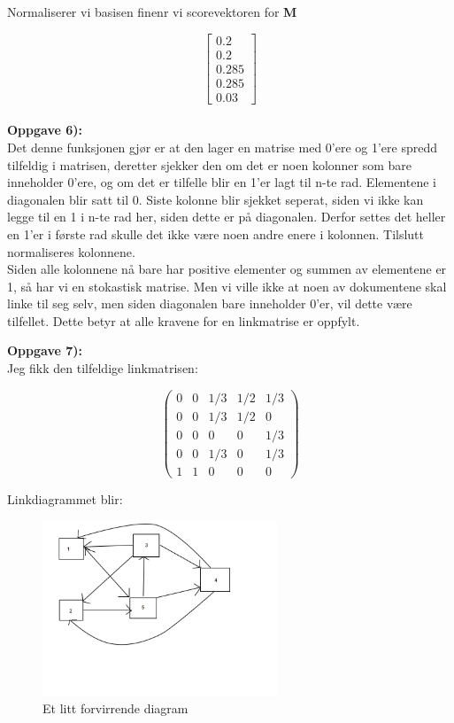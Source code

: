 \documentclass[a4paper,norsk,11pt,twoside]{article}
\begin{document}
Normaliserer vi basisen finenr vi scorevektoren for \textbf{M}

$$
\begin{bmatrix}
0.2 \\ 0.2 \\ 0.285 \\ 0.285 \\ 0.03
\end{bmatrix}
$$\\

\textbf{Oppgave 6):}\\

Det denne funksjonen gjør er at den lager en matrise med 0'ere og 1'ere spredd tilfeldig i matrisen, deretter sjekker den om det er noen kolonner som bare inneholder 0'ere, og om det er tilfelle blir en 1'er lagt til n-te rad. Elementene i diagonalen blir satt til 0. Siste kolonne blir sjekket seperat, siden vi ikke kan legge til en 1 i n-te rad her, siden dette er på diagonalen. Derfor settes det heller en 1'er i første rad skulle det ikke være noen andre enere i kolonnen. Tilslutt normaliseres kolonnene. \\

Siden alle kolonnene nå bare har positive elementer og summen av elementene er 1, så har vi en stokastisk matrise. Men vi ville ikke at noen av dokumentene skal linke til seg selv, men siden diagonalen bare inneholder 0'er, vil dette være tilfellet. Dette betyr at alle kravene for en linkmatrise er oppfylt.\\

\newpage

\textbf{Oppgave 7):}\\

Jeg fikk den tilfeldige linkmatrisen:

$$
\begin{pmatrix}
0 & 0 & 1/3 & 1/2 & 1/3 \\
0 & 0 & 1/3 & 1/2 & 0 \\
0 & 0 & 0 & 0 & 1/3 \\
0 & 0 & 1/3 & 0 & 1/3 \\
1 & 1 & 0 & 0 & 0
\end{pmatrix}
$$ 

Linkdiagrammet blir:

\begin{figure}[hbt]
\begin{center}
\includegraphics[width=70mm]{linkdiagram.png}
\caption{Et litt forvirrende diagram}\label{fig:finfigur}
\end{center}
\end{figure} 
\end{document}
